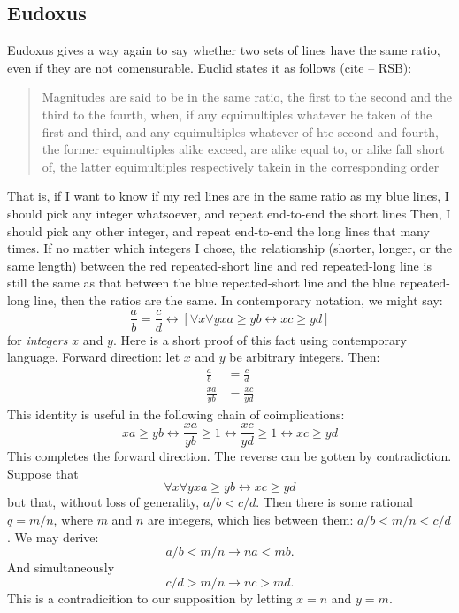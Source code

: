 \subsection{Eudoxus}
Eudoxus gives a way again to say whether two sets of lines have the same ratio,
even if they are not comensurable. Euclid states it as follows (cite -- RSB):
\begin{quote}
Magnitudes are said to be in the same ratio, the first to the second and the
third to the fourth, when, if any equimultiples whatever be taken of the first
and third, and any equimultiples whatever of hte second and fourth, the former
equimultiples alike exceed, are alike equal to, or alike fall short of, the
latter equimultiples respectively takein in the corresponding order
\end{quote}
That is, if I want to know if my red lines are in the same ratio as my blue
lines, I should pick any integer whatsoever, and repeat end-to-end the short
lines Then, I should pick any other integer, and repeat end-to-end the long
lines that many times. If no matter which integers I chose, the relationship
(shorter, longer, or the same length) between the red repeated-short line and
red repeated-long line is still the same as that between the blue
repeated-short line and the blue repeated-long line, then the ratios are the
same. In contemporary notation, we might say:
\[ \frac{a}{b} = \frac{c}{d} \leftrightarrow \left [ \forall x \forall y xa \geq yb
\leftrightarrow xc \geq yd \right ] \]
for \emph{integers} $x$ and $y$. Here is a short proof of this fact using
contemporary language. Forward direction: let $x$ and $y$ be arbitrary
integers. Then:
\begin{align*}
\frac{a}{b} &= \frac{c}{d}\\
\frac{xa}{yb} &= \frac{xc}{yd}
\end{align*}
This identity is useful in the following chain of coimplications:
\[xa \geq yb \leftrightarrow \frac{xa}{yb} \geq 1 \leftrightarrow 
\frac{xc}{yd} \geq 1 \leftrightarrow xc \geq yd\]
This completes the forward direction. The reverse can be gotten by
contradiction.  Suppose that
\[\forall x \forall y xa \geq yb \leftrightarrow xc \geq yd\]
but that, without loss of generality, $a/b < c/d$. Then there
is some rational $q=m/n$, where $m$ and $n$ are integers, which lies between
them: $a/b < m/n < c/d$. We may derive:
\[ a/b < m/n \rightarrow na < mb.\]
And simultaneously
\[ c/d > m/n \rightarrow nc > md.\]
This is a contradicition to our supposition by letting $x=n$ and $y=m$.

